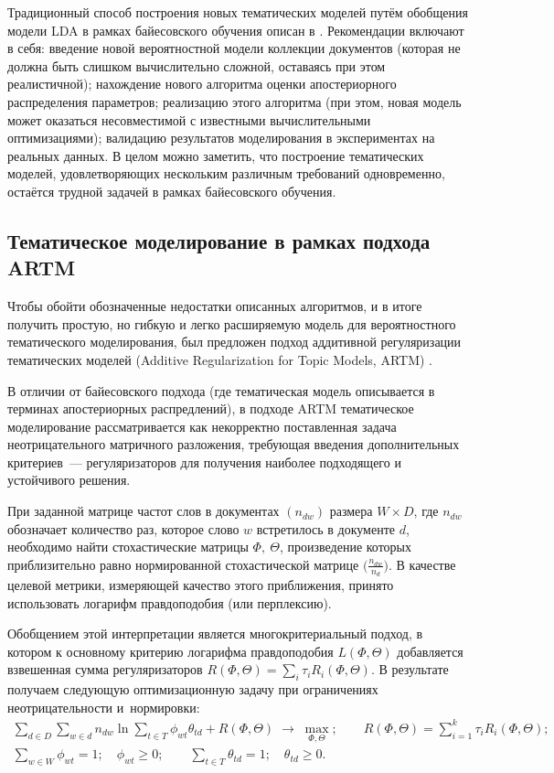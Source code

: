 Традиционный способ построения новых тематических моделей путём обобщения модели LDA в рамках байесовского обучения описан в  \cite{fntir2017applications}. 
Рекомендации включают в себя: 
введение новой вероятностной модели коллекции документов (которая не должна быть слишком вычислительно сложной, оставаясь при этом реалистичной); 
нахождение нового алгоритма оценки апостериорного распределения параметров; 
реализацию этого алгоритма (при этом, новая модель может оказаться несовместимой с известными вычислительными оптимизациями); 
валидацию результатов моделирования в экспериментах на реальных данных. 
В целом можно заметить, что построение тематических моделей, удовлетворяющих нескольким различным требований одновременно, остаётся трудной задачей в рамках байесовского обучения.

\subsection{Тематическое моделирование в рамках подхода ARTM}

Чтобы обойти обозначенные недостатки описанных алгоритмов, и в итоге получить простую, но гибкую и легко расширяемую модель для вероятностного тематического моделирования, был предложен подход аддитивной регуляризации тематических моделей (Additive Regularization for Topic Models, ARTM) \cite{vorontsov2014additive,vorontsov2014tutorial,vorontsov2015additive}. 

В отличии от байесовского подхода (где тематическая модель описывается в терминах апостериорных распредлений), в подходе ARTM тематическое моделирование рассматривается как некорректно поставленная задача неотрицательного матричного разложения, требующая введения дополнительных критериев~--- регуляризаторов для получения наиболее подходящего и устойчивого решения. 

При заданной матрице частот слов в документах  $(n_{dw})$ размера $W{\times}D$, где $n_{dw}$ обозначает количество раз, которое слово  $w$ встретилось в документе $d$, необходимо найти стохастические матрицы $\Phi,~\Theta$, произведение которых приблизительно равно нормированной стохастической матрице $\bigl(\frac{n_{dw}}{n_d}\bigr)$. В качестве целевой метрики, измеряющей качество этого приближения, принято использовать логарифм правдоподобия (или перплексию).

Обобщением этой интерпретации является многокритериальный подход, в котором к основному критерию логарифма правдоподобия $L(\Phi, \Theta)$
добавляется взвешенная сумма регуляризаторов $R(\Phi, \Theta) = \sum_i \tau_i R_i(\Phi, \Theta)$. В результате получаем следующую оптимизационную задачу при ограничениях неотрицательности и~нормировки:
\begin{gather}
\label{eq:logL+R}
    \sum_{d\in D} \sum_{w\in d}
        n_{dw}\ln
        \sum_{t\in T}
            \phi_{wt}\theta_{td}
    + R(\Phi,\Theta)
    \;\to\; \max_{\Phi,\Theta};
    \qquad
    R(\Phi,\Theta)
    = \sum_{i=1}^k \tau_i R_i(\Phi,\Theta);
\\
\label{eq:logL.constraints}
    \sum_{w\in W} \phi_{wt} = 1;
    \quad
    \phi_{wt}\geq 0;
    \qquad
    \sum_{t\in T} \theta_{td} = 1;
    \quad
    \theta_{td}\geq 0.
\end{gather}

